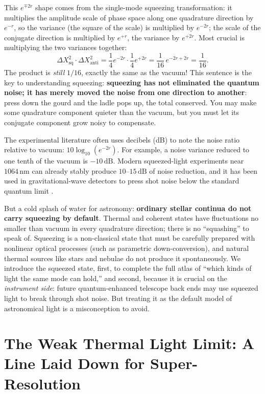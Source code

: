 This \(e^{\mp 2r}\) shape comes from the single-mode squeezing transformation: it multiplies the amplitude scale of phase space along one quadrature direction by \(e^{-r}\), so the variance (the square of the scale) is multiplied by \(e^{-2r}\); the scale of the conjugate direction is multiplied by \(e^{+r}\), the variance by \(e^{+2r}\). Most crucial is multiplying the two variances together:
\[
  \Delta X_{\text{sq}}^{2}\cdot\Delta X_{\text{anti}}^{2}
  =\frac14 e^{-2r}\cdot\frac14 e^{+2r}
  =\frac{1}{16}\,e^{-2r+2r}
  =\frac{1}{16}.
\]
The product is \emph{still} \(1/16\), exactly the same as the vacuum! This sentence is the key to understanding squeezing: \textbf{squeezing has not eliminated the quantum noise; it has merely moved the noise from one direction to another}: press down the gourd and the ladle pops up, the total conserved. You may make some quadrature component quieter than the vacuum, but you must let its conjugate component grow noisy to compensate.

The experimental literature often uses decibels (dB) to note the noise ratio relative to vacuum: \(10\log_{10}(e^{-2r})\). For example, a noise variance reduced to one tenth of the vacuum is \(-10\,\text{dB}\). Modern squeezed-light experiments near \(1064\,\text{nm}\) can already stably produce \(10\)--\(15\,\text{dB}\) of noise reduction, and it has been used in gravitational-wave detectors to press shot noise below the standard quantum limit \citep{1983Natur.306..141W,2016PhRvL.117k0801V}.

But a cold splash of water for astronomy: \textbf{ordinary stellar continua do not carry squeezing by default}. Thermal and coherent states have fluctuations no smaller than vacuum in every quadrature direction; there is no ``squashing'' to speak of. Squeezing is a non-classical state that must be carefully prepared with nonlinear optical processes (such as parametric down-conversion), and natural thermal sources like stars and nebulae do not produce it spontaneously. We introduce the squeezed state, first, to complete the full atlas of ``which kinds of light the same mode can hold,'' and second, because it is crucial on the \emph{instrument side}: future quantum-enhanced telescope back ends may use squeezed light to break through shot noise. But treating it as the default model of astronomical light is a misconception to avoid.

\section{The Weak Thermal Light Limit: A Line Laid Down for Super-Resolution}
\label{sec:e06-weak}

